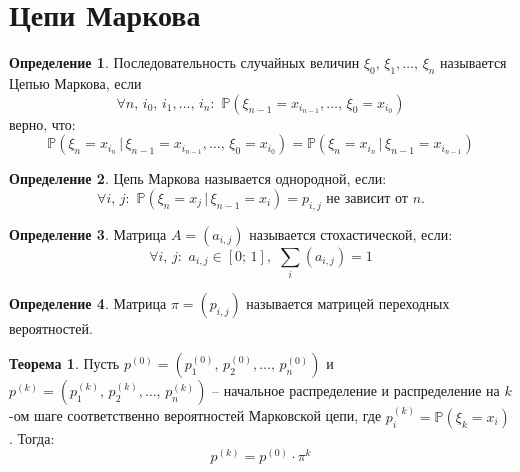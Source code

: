 \documentclass[12pt]{article}
\theoremstyle{definition}
\newtheorem{theorem}{Теорема}[section]
\newtheorem{definition}{Определение}
\newcommand{\prob}{\mathbb{P}}
\begin{document}
\section{Цепи Маркова}
\begin{definition}
    Последовательность случайных величин $\xi_0,\,\xi_1,\ldots,\,\xi_n$ называется Цепью Маркова, если 
    $$\forall n,\,i_0,\,i_1,\ldots,\,i_n:\,\,\prob(\xi_{n-1}=x_{i_{n-1}},\ldots,\,\xi_0=x_{i_{0}})$$
    верно, что:
    $$\prob(\xi_{n}=x_{i_{n}}\,|\,\xi_{n-1}=x_{i_{n-1}},\ldots,\,\xi_0=x_{i_{0}})=\prob(\xi_{n}=x_{i_{n}}\,|\,\xi_{n-1}=x_{i_{n-1}})$$
\end{definition}
\begin{definition}
    Цепь Маркова называется однородной, если:
    $$\forall i,\,j:\,\,\prob(\xi_n=x_j\,|\,\xi_{n-1}=x_i)=p_{i,j}\text{ не зависит от }n.$$
\end{definition}
\begin{definition}
    Матрица $A=(a_{i,j})$ называется стохастической, если:
    $$\forall i,\,j:\,\,a_{i,j}\in [0;\,1],\,\,\sum_{i}(a_{i,j})=1$$
\end{definition}
\begin{definition}
    Матрица $\pi=(p_{i,j})$ называется матрицей переходных вероятностей.
\end{definition}
\begin{theorem}
    Пусть $p^{(0)}=(p^{(0)}_1,\,p^{(0)}_2,\ldots,\,p^{(0)}_n)$ и $p^{(k)}=(p^{(k)}_1,\,p^{(k)}_2,\ldots,\,p^{(k)}_n)$ -- начальное распределение и распределение на $k$-ом шаге соответственно вероятностей Марковской цепи, где $p^{(k)}_i=\prob(\xi_k=x_i)$. Тогда:
    $$p^{(k)}=p^{(0)}\cdot\pi^k$$
\end{theorem}
\end{document}
